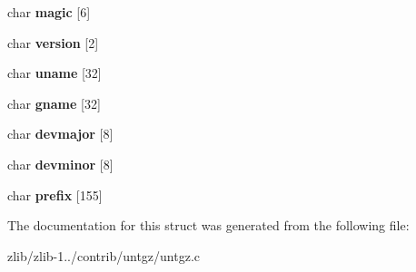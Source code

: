 \begin{DoxyCompactItemize}
\item 
\hypertarget{structtar__header_afa2e8b5df1e6836c46f8ccf32409ed04}{char {\bfseries magic} \mbox{[}6\mbox{]}}\label{structtar__header_afa2e8b5df1e6836c46f8ccf32409ed04}

\item 
\hypertarget{structtar__header_a9c591cb9f29798d5bd868b810d1ab08a}{char {\bfseries version} \mbox{[}2\mbox{]}}\label{structtar__header_a9c591cb9f29798d5bd868b810d1ab08a}

\item 
\hypertarget{structtar__header_a0f99ea2d61293751f03c3083c2ef32b4}{char {\bfseries uname} \mbox{[}32\mbox{]}}\label{structtar__header_a0f99ea2d61293751f03c3083c2ef32b4}

\item 
\hypertarget{structtar__header_a5aa08858b11f5fe7bb170f8f37770be2}{char {\bfseries gname} \mbox{[}32\mbox{]}}\label{structtar__header_a5aa08858b11f5fe7bb170f8f37770be2}

\item 
\hypertarget{structtar__header_a0b2b989ae678d00b9aa7630daa9a2225}{char {\bfseries devmajor} \mbox{[}8\mbox{]}}\label{structtar__header_a0b2b989ae678d00b9aa7630daa9a2225}

\item 
\hypertarget{structtar__header_a39a051e392f9101489eafc64b60e1ca0}{char {\bfseries devminor} \mbox{[}8\mbox{]}}\label{structtar__header_a39a051e392f9101489eafc64b60e1ca0}

\item 
\hypertarget{structtar__header_a8860aa79ded9de2c6e83cfd4c1d01799}{char {\bfseries prefix} \mbox{[}155\mbox{]}}\label{structtar__header_a8860aa79ded9de2c6e83cfd4c1d01799}

\end{DoxyCompactItemize}


The documentation for this struct was generated from the following file\+:\begin{DoxyCompactItemize}
\item 
zlib/zlib-\/1../contrib/untgz/untgz.\+c\end{DoxyCompactItemize}
